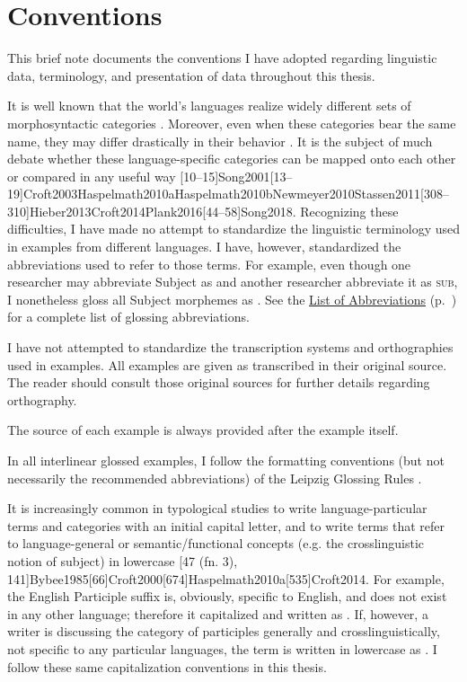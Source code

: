 \chapter*{Conventions}
\label{ch:conventions}

This brief note documents the conventions I have adopted regarding linguistic data, terminology, and presentation of data throughout this thesis.


It is well known that the world's languages realize widely different sets of morphosyntactic categories . Moreover, even when these categories bear the same name, they may differ drastically in their behavior \citep[9]{Dixon2010}. It is the subject of much debate whether these language-specific categories can be mapped onto each other or compared in any useful way [10--15]{Song2001}[13--19]{Croft2003}{Haspelmath2010a}{Haspelmath2010b}{Newmeyer2010}{Stassen2011}[308--310]{Hieber2013}{Croft2014}{Plank2016}[44--58]{Song2018}. Recognizing these difficulties, I have made no attempt to standardize the linguistic terminology used in examples from different languages. I have, however, standardized the abbreviations used to refer to those terms. For example, even though one researcher may abbreviate Subject as  and another researcher abbreviate it as \textsc{sub}, I nonetheless gloss all Subject morphemes as . See the \hyperref[ch:abbreviations]{List of Abbreviations} (p.~\pageref{ch:abbreviations}) for a complete list of glossing abbreviations.

I have not attempted to standardize the transcription systems and orthographies used in examples. All examples are given as transcribed in their original source. The reader should consult those original sources for further details regarding orthography.

The source of each example is always provided after the example itself.

In all interlinear glossed examples, I follow the formatting conventions (but not necessarily the recommended abbreviations) of the Leipzig Glossing Rules \citep{BickelComrieHaspelmath2015}.


It is increasingly common in typological studies to write language-particular terms and categories with an initial capital letter, and to write terms that refer to language-general or semantic/functional concepts (e.g. the crosslinguistic notion of subject) in lowercase [47 (fn. 3), 141]{Bybee1985}[66]{Croft2000}[674]{Haspelmath2010a}[535]{Croft2014}. For example, the English Participle suffix  is, obviously, specific to English, and does not exist in any other language; therefore it capitalized and written as . If, however, a writer is discussing the category of participles generally and crosslinguistically, not specific to any particular languages, the term is written in lowercase as . I follow these same capitalization conventions in this thesis.

